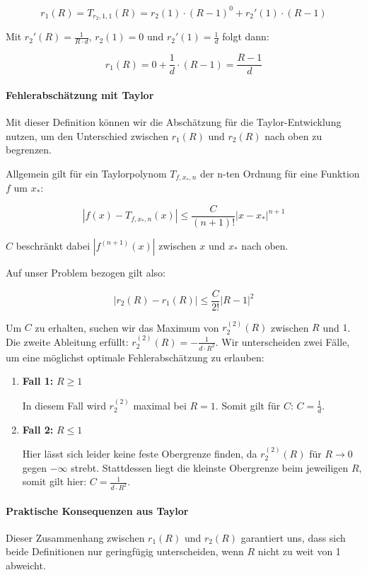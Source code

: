 \documentclass[a4paper]{article}
\begin{document}
    $$ r_{1}(R) = T_{r_{2},1,1}(R) = r_{2}(1) \cdot (R-1)^0 + r_{2}'(1) \cdot (R-1) $$

    Mit $r_{2}'(R) = \frac{1}{R \cdot d}$, $r_{2}(1) = 0$ und $r_{2}'(1) = \frac{1}{d}$ folgt dann:

    $$ r_{1}(R) = 0 + \frac{1}{d} \cdot (R-1) = \frac{R-1}{d} $$

    \paragraph{Fehlerabschätzung mit Taylor}Mit dieser Definition können wir die Abschätzung für die Taylor-Entwicklung nutzen, um den Unterschied zwischen $r_{1}(R)$ und $r_{2}(R)$ nach oben zu begrenzen. 

    Allgemein gilt für ein Taylorpolynom $T_{f,x_{*}, n}$ der n-ten Ordnung für eine Funktion $f$ um $x_{*}$:

    $$ |f(x) - T_{f,x_{*}, n}(x)| \leq \frac{C}{(n+1)!}|x-x_{*}|^{n+1} $$

    $C$ beschränkt dabei $|f^{(n+1)}(x)|$ zwischen $x$ und $x_{*}$ nach oben.

    Auf unser Problem bezogen gilt also: 

    $$ |r_{2}(R) - r_{1}(R)| \leq \frac{C}{2!}|R-1|^{2} $$

    Um $C$ zu erhalten, suchen wir das Maximum von $r_{2}^{(2)}(R)$ zwischen $R$ und $1$. Die zweite Ableitung erfüllt: $r_{2}^{(2)}(R) = -\frac{1}{d \cdot R^2}$. Wir unterscheiden zwei Fälle, um eine möglichst optimale Fehlerabschätzung zu erlauben: 

    \begin{enumerate}
        \item \textbf{Fall 1:} $R \geq 1$
        
        In diesem Fall wird $r_{2}^{(2)}$ maximal bei $R=1$. Somit gilt für $C$: $C=\frac{1}{d}$. 
        
        \item \textbf{Fall 2:} $R \le 1$
        
        Hier lässt sich leider keine feste Obergrenze finden, da $r_{2}^{(2)}(R)$ für $R \rightarrow 0$ gegen $-\infty$ strebt. Stattdessen liegt die kleinste Obergrenze beim jeweiligen $R$, somit gilt hier: $C = \frac{1}{d \cdot R^2}$.
    \end{enumerate}

    \paragraph{Praktische Konsequenzen aus Taylor}Dieser Zusammenhang zwischen $r_1(R)$ und $r_2(R)$ garantiert uns, dass sich beide Definitionen nur geringfügig unterscheiden, wenn $R$ nicht zu weit von 1 abweicht. 
\end{document}
